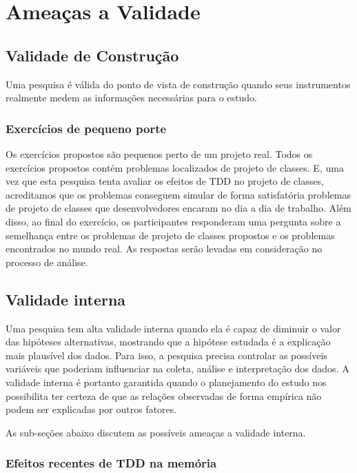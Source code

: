 \chapter{Ameaças a Validade}
\label{cap:ameacas}

\section{Validade de Construção}

Uma pesquisa é válida do ponto de vista de construção quando seus instrumentos realmente
medem as informações necessárias para o estudo.

\subsection{Exercícios de pequeno porte}

Os exercícios propostos são pequenos perto de um projeto real. Todos os exercícios propostos contém
problemas localizados de projeto de classes. E, uma vez que esta pesquisa tenta avaliar os efeitos de TDD no projeto de classes, 
acreditamos que os problemas conseguem simular de forma satisfatória
problemas de projeto de classes que desenvolvedores encaram no dia a dia de trabalho.
Além disso, ao final do exercício, os participantes responderam uma pergunta sobre a semelhança
entre os problemas de projeto de classes propostos e os problemas encontrados no mundo real.
As respostas serão levadas em consideração no processo de análise.

\section{Validade interna}

Uma pesquisa tem alta validade interna quando ela é capaz de diminuir o valor das hipóteses alternativas, mostrando
que a hipótese estudada é a explicação mais plausível dos dados. Para isso, a pesquisa precisa controlar as possíveis
variáveis que poderiam influenciar na coleta, análise e interpretação dos dados. A validade interna é portanto
garantida quando o planejamento do estudo nos possibilita ter certeza de que as relações observadas de
forma empírica não podem ser explicadas por outros fatores.

As sub-seções abaixo discutem as possíveis ameaças a validade interna.

\subsection{Efeitos recentes de TDD na memória}

